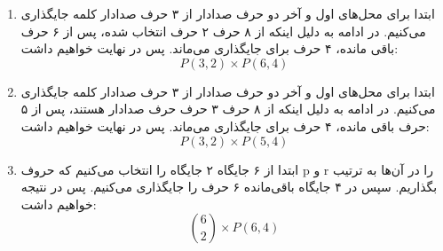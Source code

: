 \begin{enumerate}
  \item 
      ابتدا برای محل‌های اول و آخر دو حرف صدادار از ۳ حرف صدادار کلمه جایگذاری می‌کنیم. در ادامه به دلیل اینکه از ۸ حرف ۲ حرف انتخاب شده، پس از ۶ حرف باقی مانده، ۴ حرف برای جایگذاری می‌ماند. پس در نهایت خواهیم داشت:
        $$P(3,2)\times P(6,4)$$

  \item 
      ابتدا برای محل‌های اول و آخر دو حرف صدادار از ۳ حرف صدادار کلمه جایگذاری می‌کنیم. در ادامه به دلیل اینکه از ۸ حرف ۳ حرف حرف صدادار هستند، پس از ۵ حرف باقی مانده، ۴ حرف برای جایگذاری می‌ماند. پس در نهایت خواهیم داشت:
        $$P(3,2)\times P(5,4)$$

  \item 
      ابتدا از ۶ جایگاه ۲ جایگاه را انتخاب می‌کنیم که حروف p و r
      را در آن‌ها به ترتیب بگذاریم. سپس در ۴ جایگاه باقی‌مانده ۶ حرف را جایگذاری می‌کنیم. پس در نتیجه خواهیم داشت:
        $${6 \choose 2}\times P(6,4)$$
\end{enumerate}